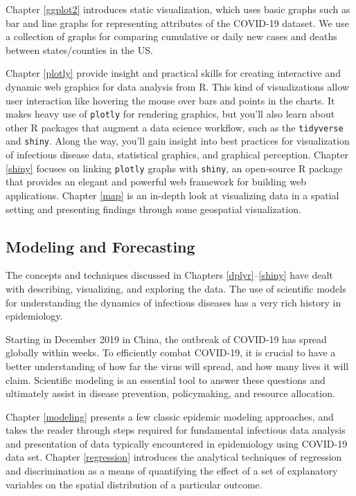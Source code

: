 \documentclass[]{book}
\begin{document}
Chapter \ref{ggplot2} introduces static visualization, which uses basic
graphs such as bar and line graphs for representing attributes of the
COVID-19 dataset. We use a collection of graphs for comparing cumulative
or daily new cases and deaths between states/counties in the US.

Chapter \ref{plotly} provide insight and practical skills for creating
interactive and dynamic web graphics for data analysis from R. This kind
of visualizations allow user interaction like hovering the mouse over
bars and points in the charts. It makes heavy use of \texttt{plotly} for
rendering graphics, but you'll also learn about other R packages that
augment a data science workflow, such as the \texttt{tidyverse} and
\texttt{shiny}. Along the way, you'll gain insight into best practices
for visualization of infectious disease data, statistical graphics, and
graphical perception. Chapter \ref{shiny} focuses on linking
\texttt{plotly} graphs with \texttt{shiny}, an open-source R package
that provides an elegant and powerful web framework for building web
applications. Chapter \ref{map} is an in-depth look at visualizing data
in a spatial setting and presenting findings through some geospatial
visualization.

\subsection{Modeling and Forecasting}\label{modeling-and-forecasting}

The concepts and techniques discussed in Chapters
\ref{dplyr}--\ref{shiny} have dealt with describing, visualizing, and
exploring the data. The use of scientific models for understanding the
dynamics of infectious diseases has a very rich history in epidemiology.

Starting in December 2019 in China, the outbreak of COVID-19 has spread
globally within weeks. To efficiently combat COVID-19, it is crucial to
have a better understanding of how far the virus will spread, and how
many lives it will claim. Scientific modeling is an essential tool to
answer these questions and ultimately assist in disease prevention,
policymaking, and resource allocation.

Chapter \ref{modeling} presents a few classic epidemic modeling
approaches, and takes the reader through steps required for fundamental
infectious data analysis and presentation of data typically encountered
in epidemiology using COVID-19 data set. Chapter \ref{regression}
introduces the analytical techniques of regression and discrimination as
a means of quantifying the effect of a set of explanatory variables on
the spatial distribution of a particular outcome.
\end{document}
